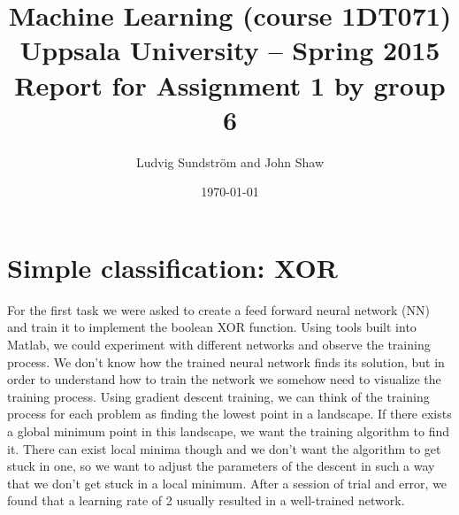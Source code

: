 \documentclass[a4paper]{article}
\title{Machine Learning (course 1DT071)
Uppsala University – Spring 2015
Report for Assignment 1 by group 6}
\author{Ludvig Sundstr\"{o}m and John Shaw}
\date{\today}
\begin{document}
\maketitle

\section{Simple classification: XOR}

For the first task we were asked to create a feed forward neural network (NN) and 
train it to implement the boolean XOR function. Using tools built into Matlab, we 
could experiment with different networks and observe the training process. 
We don't know how the trained neural network finds its solution, 
but in order to understand how to train the network we somehow need to 
visualize the training process. 
Using gradient descent training, we can think of the training process for each problem 
as finding the lowest point in a landscape. If there exists a global minimum point in 
this landscape, we want the training algorithm to find it. There can exist local minima 
though and we don't want the algorithm to get stuck in one, so we want to 
adjust the parameters of the descent in such a way that we don't get stuck in a local 
minimum. After a session of trial and error, we found that a learning rate of 2 
usually resulted in a well-trained network. 
\end{document}

